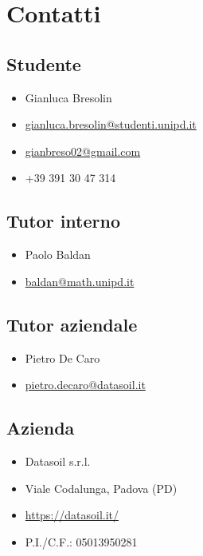 \documentclass[a4paper, 12pt]{article}
\begin{document}
\section{Contatti}

\subsection{Studente}
\begin{itemize}
    \item Gianluca Bresolin
    \item \href{mailto:gianluca.bresolin@studenti.unipd.it}{gianluca.bresolin@studenti.unipd.it}
    \item \href{mailto:gianbreso02@gmail.com}{gianbreso02@gmail.com}
    \item +39 391 30 47 314
\end{itemize}

\subsection{Tutor interno}
\begin{itemize}
    \item Paolo Baldan
    \item \href{mailto:baldan@math.unipd.it}{baldan@math.unipd.it}
\end{itemize}

\subsection{Tutor aziendale}
\begin{itemize}
    \item Pietro De Caro
    \item \href{mailto:pietro.decaro@datasoil.it}{pietro.decaro@datasoil.it}
\end{itemize}

\subsection{Azienda}
\begin{itemize}
    \item Datasoil s.r.l.
    \item Viale Codalunga, Padova (PD)
    \item \href{https://datasoil.it/}{https://datasoil.it/}
    \item P.I./C.F.: 05013950281
\end{itemize}
\end{document}
